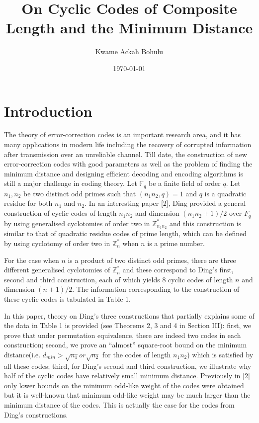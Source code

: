 \documentclass[fontsize=12pt]{article}
\title{On Cyclic Codes of Composite Length
and the Minimum Distance}
\author{Kwame Ackah Bohulu}
\date{\today}
\begin{document}
\maketitle

\newpage
\section{Introduction}
The theory of error-correction codes is an important
research area, and it has many applications in modern life including the recovery of corrupted information after transmission
over an unreliable channel.
Till date, the construction of  new error-correction codes
with good parameters as well as the problem of finding the minimum distance and designing efficient decoding
and encoding algorithms is still a major challenge in coding theory.
Let $\mathbb{F}_q$ be a finite field of order $q$. Let $n_1, n_2$ be two distinct
odd primes such that $(n_1n_2, q) = 1$ and $q$ is a quadratic residue
for both $n_1$ and $n_2$.
In an interesting paper [2], Ding provided a
general construction of cyclic codes of length $n_1n_2$ and dimension
$(n_1n_2 + 1)/2$ over $F_q$ by using generalised cyclotomies
of order two in $\mathbb{Z}^*_{n_1n_2}$ and this construction is similar to that of
quadratic residue codes of prime length, which can be defined
by using cyclotomy of order two in $\mathbb{Z}^*_n$
when $n$ is a prime number.

For the case when  $n$ is a product of two distinct odd primes, there are three different generalised cyclotomies of
$\mathbb{Z}^*_n$ and these 
correspond to Ding’s first, second and third construction,
each of which yields $8$ cyclic codes of length $n$ and dimension
$(n +1)/2$. The information corresponding to the construction of these cyclic codes is tabulated in Table 1.

In this paper, theory on Ding’s three constructions
that partially explains some of the data in Table 1 is provided
(see Theorems 2, 3 and 4 in Section III): first, we prove
that under permutation equivalence, there are indeed two
codes in each construction; second, we prove an ``almost''
square-root bound  on the minimum distance(i.e. $d_{min} >
\sqrt{n_1} or
\sqrt{n_2}$ for the codes of length $n_1n_2$) which is satisfied
by all these codes; third, for Ding’s second and third
construction, we illustrate why half of the cyclic codes have
relatively small minimum distance.
Previously in [2] only
lower bounds on the minimum odd-like weight of the codes
were obtained but it is well-known that minimum odd-like
weight may be much larger than the minimum distance of
the codes. This is actually the case for the codes from Ding’s
constructions.
\end{document}

